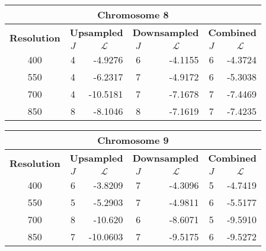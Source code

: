 \begin{table}[h!]
  \centering
\begin{tabular}{|c|c|r|c|r|c|r|}\hline
\multicolumn{7}{|c|}{\textbf{Chromosome 8}} \\ \hline
\multirow{2}{*}{\textbf{Resolution}} & \multicolumn{2}{|c|}{\textbf{Upsampled}} &  \multicolumn{2}{|c|}{\textbf{Downsampled}} &  \multicolumn{2}{|c|}{\textbf{Combined}} \\ \cline{2-7}
    & $J$ & \multicolumn{1}{|c|}{\textbf{$\mathcal{L}$}} & $J$ & \multicolumn{1}{|c|}{\textbf{$\mathcal{L}$}} &$J$ & \multicolumn{1}{|c|}{\textbf{$\mathcal{L}$}}   \\ \hline
400 & 4 & -4.9276 & 6 & -4.1155 & 6 & -4.3724  \\ \hline
550 & 4 & -6.2317 & 7 & -4.9172 & 6 & -5.3038  \\ \hline
700 & 4 & -10.5181 & 7 & -7.1678 & 7 & -7.4469  \\ \hline
850 & 8 & -8.1046 & 8 & -7.1619 & 7 & -7.4235  \\ \hline
\end{tabular}
\end{table}

\begin{table}[h!]
  \centering
\begin{tabular}{|c|c|r|c|r|c|r|}\hline
\multicolumn{7}{|c|}{\textbf{Chromosome 9}} \\ \hline
\multirow{2}{*}{\textbf{Resolution}} & \multicolumn{2}{|c|}{\textbf{Upsampled}} &  \multicolumn{2}{|c|}{\textbf{Downsampled}} &  \multicolumn{2}{|c|}{\textbf{Combined}} \\ \cline{2-7}
    & $J$ & \multicolumn{1}{|c|}{\textbf{$\mathcal{L}$}} & $J$ & \multicolumn{1}{|c|}{\textbf{$\mathcal{L}$}} &$J$ & \multicolumn{1}{|c|}{\textbf{$\mathcal{L}$}}   \\ \hline
400 & 6 & -3.8209 & 7 & -4.3096 & 5 & -4.7419  \\ \hline
550 & 5 & -5.2903 & 7 & -4.9811 & 6 & -5.5177  \\ \hline
700 & 8 & -10.620 & 6 & -8.6071 & 5 & -9.5910  \\ \hline
850 & 7 & -10.0603 & 7 & -9.5175 & 6 & -9.5272  \\ \hline
\end{tabular}
\end{table}

\clearpage

